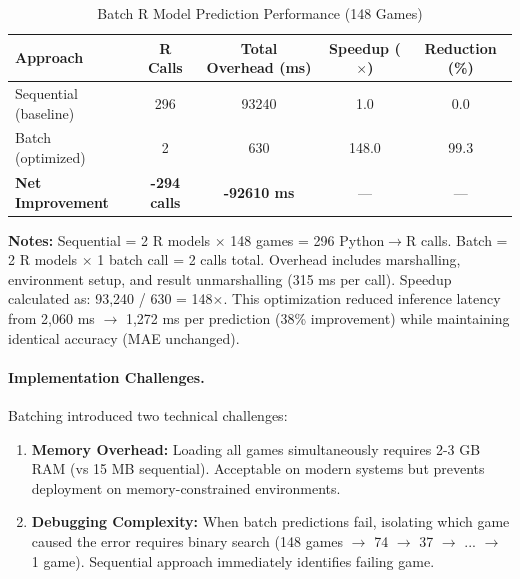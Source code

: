 \begin{table}[htbp]
\centering
\caption{Batch R Model Prediction Performance (148 Games)}
\label{tab:batch-prediction-results}
\small
\begin{tabular}{@{} l S[table-format=6.0] S[table-format=6.0] S[table-format=3.1] S[table-format=2.1] @{}}
\toprule
\textbf{Approach} & \textbf{R Calls} & \textbf{Total Overhead (ms)} & \textbf{Speedup ($\times$)} & \textbf{Reduction (\%)} \\
\midrule
Sequential (baseline) & 296 & 93240 & 1.0 & 0.0 \\
Batch (optimized) & 2 & 630 & 148.0 & 99.3 \\
\baselinerule
\textbf{Net Improvement} & \textbf{-294 calls} & \textbf{-92610 ms} & --- & --- \\
\bottomrule
\end{tabular}
\begin{tablenotes}
\item \textbf{Notes:} Sequential = 2 R models $\times$ 148 games = 296 Python$\to$R calls. Batch = 2 R models $\times$ 1 batch call = 2 calls total. Overhead includes marshalling, environment setup, and result unmarshalling (315 ms per call). Speedup calculated as: 93,240 / 630 = 148$\times$. This optimization reduced inference latency from 2,060 ms $\to$ 1,272 ms per prediction (38\% improvement) while maintaining identical accuracy (MAE unchanged).
\end{tablenotes}
\end{table}

\paragraph{Implementation Challenges.}
Batching introduced two technical challenges:

\begin{enumerate}[itemsep=2pt,parsep=0pt]
    \item \textbf{Memory Overhead:} Loading all games simultaneously requires 2-3 GB RAM (vs 15 MB sequential). Acceptable on modern systems but prevents deployment on memory-constrained environments.

    \item \textbf{Debugging Complexity:} When batch predictions fail, isolating which game caused the error requires binary search (148 games $\to$ 74 $\to$ 37 $\to$ ... $\to$ 1 game). Sequential approach immediately identifies failing game.
\end{enumerate}

